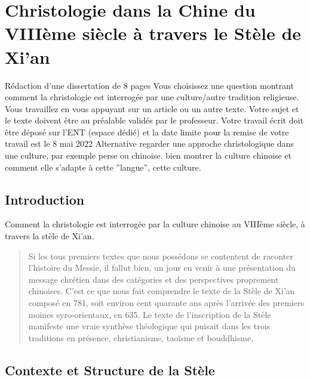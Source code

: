 \chapter{Christologie dans la Chine du VIIIème siècle à travers le Stèle de Xi'an}

\label{ch:christologieChine}
Rédaction d’une dissertation de 8 pages Vous choisissez une question
montrant comment la christologie est interrogée par une culture/autre tradition
religieuse. Vous travaillez en vous appuyant sur un article ou un autre texte.
Votre sujet et le texte doivent être au préalable validés par le professeur. Votre
travail écrit doit être déposé sur l’ENT (espace dédié) et la date limite pour la
remise de votre travail est le 8 mai 2022
Alternative regarder une approche christologique dans une culture, par exemple
perse ou chinoise. bien montrer la culture chinoise et comment elle s’adapte à
cette ”langue”, cette culture.
\section{Introduction}


Comment la christologie est interrogée par la culture chinoise au VIIIème siècle, à travers la stèle de Xi'an.

\begin{quote}
Si les tous premiers textes que nous possédons se contentent de raconter l'histoire du Messie, il fallut bien, un jour en venir à une présentation du message chrétien dans des catégories et des perspectives proprement chinoises. C'est ce que nous fait comprendre le texte de la Stèle de Xi'an composé en 781, soit environ cent quarante ans après l'arrivée des premiers moines syro-orientaux, en 635. 
Le texte de l'inscription de la Stèle manifeste une vraie synthèse théologique qui puisait dans les trois traditions en présence, christianisme, taoïsme et bouddhisme. \cite[p.~150]{Raguin:JesusMessieXian} 
\end{quote}

\section{Contexte et Structure de la Stèle}
